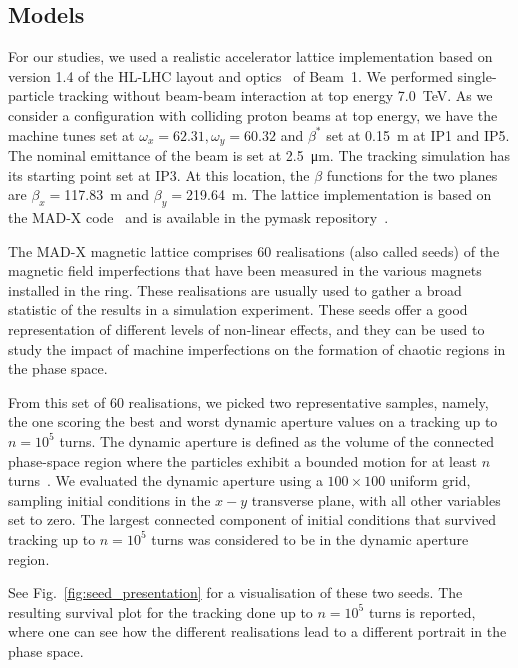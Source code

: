 \subsection{Models} \label{sec:model}
%
For our studies, we used a realistic accelerator lattice implementation based on version 1.4 of the HL-LHC layout and optics~\cite{Maria_2019} of Beam~1. We performed single-particle tracking without beam-beam interaction at top energy \SI{7.0}{TeV}. As we consider a configuration with colliding proton beams at top energy, we have the machine tunes set at $\omega_x=62.31, \omega_y=60.32$ and $\beta^\ast$ set at \SI{0.15}{\meter} at IP1 and IP5. The nominal emittance of the beam is set at \SI{2.5}{\micro \meter}. The tracking simulation has its starting point set at IP3. At this location, the $\beta$ functions for the two planes are $\beta_x=$\SI{117.83}{\meter} and $\beta_y=$\SI{219.64}{\meter}. The lattice implementation is based on the MAD-X code~\cite{madx} and is available in the pymask repository~\cite{pymask}.

The MAD-X magnetic lattice comprises 60 realisations (also called seeds) of the magnetic field imperfections that have been measured in the various magnets installed in the ring. These realisations are usually used to gather a broad statistic of the results in a simulation experiment. These seeds offer a good representation of different levels of non-linear effects, and they can be used to study the impact of machine imperfections on the formation of chaotic regions in the phase space.

From this set of 60 realisations, we picked two representative samples, namely, the one scoring the best and worst dynamic aperture values on a tracking up to $n=10^5$ turns. The dynamic aperture is defined as the volume of the connected phase-space region where the particles exhibit a bounded motion for at least $n$ turns~\cite{DAdef, invlog}. We evaluated the dynamic aperture using a $100\times100$ uniform grid, sampling initial conditions in the $x-y$ transverse plane, with all other variables set to zero. The largest connected component of initial conditions that survived tracking up to $n=10^5$ turns was considered to be in the dynamic aperture region.

See Fig.~\ref{fig:seed_presentation} for a visualisation of these two seeds. The resulting survival plot for the tracking done up to $n=10^5$ turns is reported, where one can see how the different realisations lead to a different portrait in the phase space.

